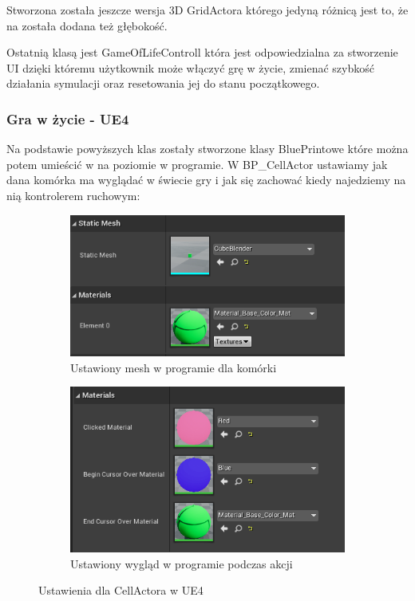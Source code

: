 \documentclass[a4paper,12pt,reqno]{article}
\begin{document}
Stworzona została jeszcze wersja 3D GridActora którego jedyną różnicą jest to, że na została dodana też głębokość.

Ostatnią klasą jest GameOfLifeControll która jest odpowiedzialna
za stworzenie UI dzięki któremu użytkownik może włączyć grę w życie, zmienać szybkość działania symulacji oraz resetowania jej do stanu początkowego.

\subsubsection{Gra w życie - UE4}

Na podstawie powyższych klas zostały stworzone klasy BluePrintowe które można potem umieścić w na poziomie w programie. W BP\_CellActor ustawiamy jak dana komórka ma wyglądać w świecie gry i jak się zachować kiedy najedziemy na nią kontrolerem ruchowym:

\begin{figure}[H]%
	\centering
	\begin{subfigure}{.45\textwidth}
		\centering
		\includegraphics[width=0.8\linewidth]{graphics/CellActorInUE_1.png}
		\caption{Ustawiony mesh w programie dla komórki}	
		\label{ref:subref_a}
	\end{subfigure}%
	\begin{subfigure}{.45\textwidth}
		\centering
		\includegraphics[width=0.8\linewidth]{graphics/CellActorInUE_2.png}
		\caption{Ustawiony wygląd w programie podczas akcji}
		\label{ref:subref_b}
	\end{subfigure}%
	

\caption{Ustawienia dla CellActora w UE4}
\label{ref:ref}
\end{figure}
\end{document}
